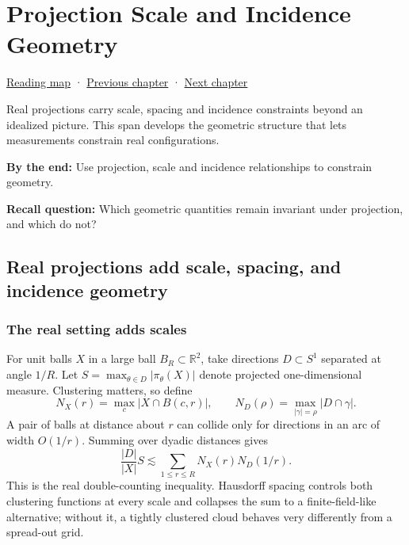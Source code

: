 \hypertarget{04-visual-computing-ii-ch033}{}
\chapter{Projection Scale and Incidence Geometry}\label{04-visual-computing-ii-ch033-projection-scale-and-incidence-geometry}

\hyperref[volume-reading-map]{Reading map} · \hyperref[04-visual-computing-ii-ch032-pose-estimation-and-robust-fitting]{Previous chapter} · \hyperref[04-visual-computing-ii-ch034-learned-3d-shapes-and-scene-representations]{Next chapter}

Real projections carry scale, spacing and incidence constraints beyond an idealized picture. This span develops the geometric structure that lets measurements constrain real configurations.

\textbf{By the end:} Use projection, scale and incidence relationships to constrain geometry.

\textbf{Recall question:} Which geometric quantities remain invariant under projection, and which do not?

\section{Real projections add scale, spacing, and incidence geometry}\label{04-visual-computing-ii-ch033-real-projections-add-scale-spacing-and-incidence-geometry}

\subsection{The real setting adds scales}\label{04-visual-computing-ii-ch033-the-real-setting-adds-scales}

For unit balls \(X\) in a large ball \(B_R\subset\mathbb R^2\), take directions \(D\subset S^1\) separated at angle \(1/R\). Let \(S=\max_{\theta\in D}|\pi_\theta(X)|\) denote projected one-dimensional measure. Clustering matters, so define \[N_X(r)=\max_c|X\cap B(c,r)|,\qquad
N_D(\rho)=\max_{|\gamma|=\rho}|D\cap\gamma|.\] A pair of balls at distance about \(r\) can collide only for directions in an arc of width \(O(1/r)\). Summing over dyadic distances gives \[\frac{|D|}{|X|}S\lesssim\sum_{1\le r\le R}N_X(r)N_D(1/r).\] This is the real double-counting inequality. Hausdorff spacing controls both clustering functions at every scale and collapses the sum to a finite-field-like alternative; without it, a tightly clustered cloud behaves very differently from a spread-out grid.

